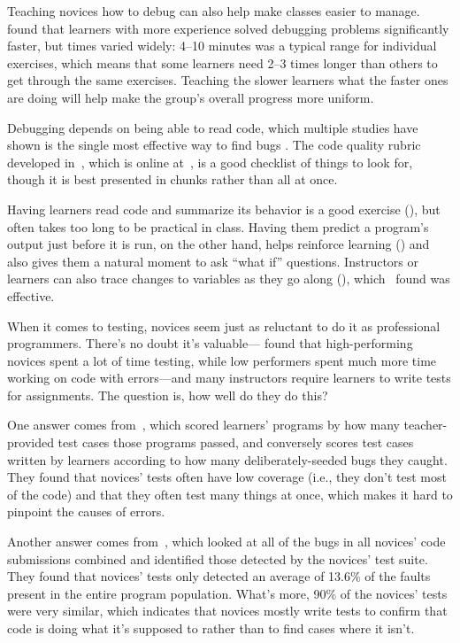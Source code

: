 Teaching novices how to debug can also help make classes easier to manage. \cite{Alqa2017} found that learners with more experience solved debugging problems significantly faster, but times varied widely: 4--10 minutes was a typical range for individual exercises, which means that some learners need 2--3 times longer than others to get through the same exercises. Teaching the slower learners what the faster ones are doing will help make the group's overall progress more uniform.

Debugging depends on being able to read code, which multiple studies have shown is the single most effective way to find bugs \cite{Basi1987,Keme2009,Bacc2013}. The code quality rubric developed in~\cite{Steg2014,Steg2016a}, which is online at~\cite{Steg2016b}, is a good checklist of things to look for, though it is best presented in chunks rather than all at once.

Having learners read code and summarize its behavior is a good exercise (), but often takes too long to be practical in class. Having them predict a program's output just before it is run, on the other hand, helps reinforce learning () and also gives them a natural moment to ask ``what if'' questions. Instructors or learners can also trace changes to variables as they go along (), which~\cite{Cunn2017} found was effective.


When it comes to testing, novices seem just as reluctant to do it as professional programmers. There's no doubt it's valuable---\cite{Cart2017} found that high-performing novices spent a lot of time testing, while low performers spent much more time working on code with errors---and many instructors require learners to write tests for assignments. The question is, how well do they do this?

One answer comes from~\cite{Bria2015}, which scored learners' programs by how many teacher-provided test cases those programs passed, and conversely scores test cases written by learners according to how many deliberately-seeded bugs they caught. They found that novices' tests often have low coverage (i.e., they don't test most of the code) and that they often test many things at once, which makes it hard to pinpoint the causes of errors.

Another answer comes from~\cite{Edwa2014b}, which looked at all of the bugs in all novices' code submissions combined and identified those detected by the novices' test suite. They found that novices' tests only detected an average of 13.6\% of the faults present in the entire program population. What's more, 90\% of the novices' tests were very similar, which indicates that novices mostly write tests to confirm that code is doing what it's supposed to rather than to find cases where it isn't.

